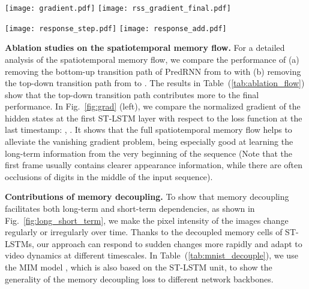\documentclass[10pt,journal,compsoc]{IEEEtran}
\let\MYoriglatexcaption\caption
\renewcommand{\caption}[2][\relax]{\MYoriglatexcaption[#2]{#2}}
\newcommand{\tab}[1]{Table~(\ref{#1})}
\newcommand{\fig}[1]{Fig.~\ref{#1}}
\newcommand{\myparagraph}[1]{\vspace{5pt} \noindent \textbf{#1.}}
\begin{document}
\begin{figure*}[t]
  \centering
  {
    \texttt{[image: gradient.pdf]}
  }
  \hfil
  {
    \texttt{[image: rss\_gradient\_final.pdf]}
  }
  \vspace{-5pt}
\caption{Gradient analyses on the Moving MNIST dataset (). \textbf{Left:} , which shows the importance of the spatiotemporal memory flow of ST-LSTMs; \textbf{Right:} , which shows the importance of the reverse scheduled sampling (the 2nd training strategy in \fig{fig:rss_schemes} with an exponentially increasing ).
}
\label{fig:grad}
\end{figure*}


\begin{figure*}[t]
  \centering
{
    \texttt{[image: response\_step.pdf]}
  }
  \hfil
{
    \texttt{[image: response\_add.pdf]}
  }
  \vspace{-5pt}
\caption{Model performance under different types of temporal dynamics, where the Y axis represents the per-pixel intensity of each predicted frame. By leveraging ST-LSTMs with memory decoupling, the proposed model can respond more rapidly to unexpected, sudden variations (\textbf{left}), and simultaneously capture temporal dynamics at different timescales (\textbf{right}). 
}
\label{fig:long_short_term}
\end{figure*}






\myparagraph{Ablation studies on the spatiotemporal memory flow}
For a detailed analysis of the spatiotemporal memory flow, we compare the performance of (a) removing the bottom-up transition path of PredRNN from  to  with (b) removing the top-down transition path from  to  . The results in \tab{tab:ablation_flow} show that the top-down transition path contributes more to the final performance. 
In \fig{fig:grad} (left), we compare the normalized gradient of the hidden states  at the first ST-LSTM layer with respect to the loss function at the last timestamp: , . 
It shows that the full spatiotemporal memory flow helps to alleviate the vanishing gradient problem, being especially good at learning the long-term information from the very beginning of the sequence (Note that the first frame usually contains clearer appearance information, while there are often occlusions of digits in the middle of the input sequence).



\myparagraph{Contributions of memory decoupling}
To show that memory decoupling facilitates both long-term and short-term dependencies, as shown in \fig{fig:long_short_term}, we make the pixel intensity of the images change regularly or irregularly over time. 
Thanks to the decoupled memory cells of ST-LSTMs, our approach can respond to sudden changes more rapidly and adapt to video dynamics at different timescales.
In \tab{tab:mnist_decouple}, we use the MIM model \cite{wang2019memory}, which is also based on the ST-LSTM unit, to show the generality of the memory decoupling loss to different network backbones.
\end{document}
